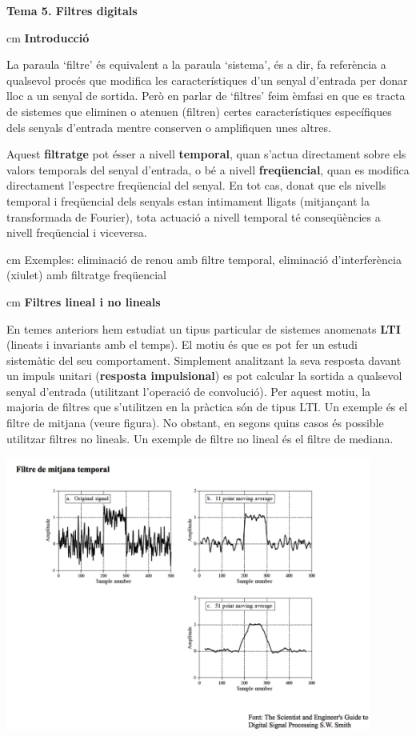 \documentclass{article}
\begin{document}
\textbf{\Large Tema 5. Filtres digitals}

 cm
\noindent
\textbf{\large Introducció}

La paraula `filtre' és equivalent a la paraula `sistema', és a dir, fa referència a qualsevol procés que modifica
les característiques d'un senyal d'entrada per donar lloc a un senyal de sortida.
Però en parlar de `filtres' feim èmfasi en que es tracta de sistemes que eliminen o atenuen (filtren) certes característiques 
específiques dels senyals d'entrada mentre conserven o amplifiquen unes altres.

Aquest \textbf{filtratge} pot ésser a nivell \textbf{temporal}, quan s'actua directament sobre els valors temporals del senyal d'entrada,
o bé a nivell \textbf{freqüencial}, quan es modifica directament l'espectre freqüencial del senyal. En tot cas, donat que els nivells
temporal i freqüencial dels senyals estan intimament lligats (mitjançant la transformada de Fourier), tota actuació a nivell temporal
té conseqüències a nivell freqüencial i viceversa.

 cm
Exemples: eliminació de renou amb filtre temporal, eliminació d'interferència (xiulet) amb filtratge freqüencial

 cm
\textbf{Filtres lineal i no lineals}

 En temes anteriors hem estudiat un tipus particular de sistemes anomenats \textbf{LTI} (lineats i invariants 
amb el temps). El motiu és que es pot fer un estudi sistemàtic del seu comportament. Simplement analitzant la seva resposta davant un impuls unitari (\textbf{resposta impulsional}) es pot calcular la sortida a qualsevol senyal d'entrada (utilitzant l'operació de convolució).
Per aquest motiu, la majoria de filtres que s'utilitzen en la pràctica són de tipus LTI. Un exemple és el filtre de mitjana (veure figura).
No obstant, en segons quins casos és possible utilitzar filtres no lineals. Un exemple de filtre no lineal és el filtre de mediana.

\includegraphics[width=12cm]{mitjanatemp.png}
 
\end{document}

